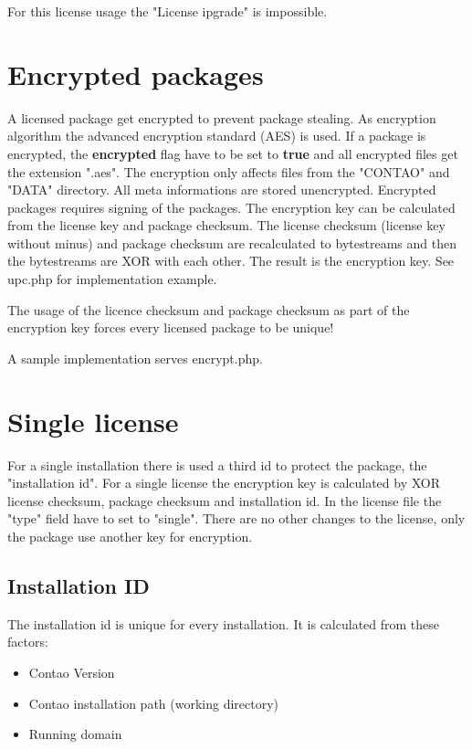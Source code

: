For this license usage the "License ipgrade" is impossible.

\section[sec:encrypted packages]{Encrypted packages}

A licensed package get encrypted to prevent package stealing.
As encryption algorithm the advanced encryption standard (AES) is used.
If a package is encrypted, the \textbf{encrypted} flag have to be set to \textbf{true} and all encrypted files get the extension ".aes".
The encryption only affects files from the "CONTAO" and "DATA" directory.
All meta informations are stored unencrypted.
Encrypted packages requires signing of the packages.
The encryption key can be calculated from the license key and package checksum.
The license checksum (license key without minus) and package checksum are recalculated to bytestreams and then the bytestreams are XOR with each other. The result is the encryption key.
See upc.php for implementation example.

The usage of the licence checksum and package checksum as part of the encryption key forces every licensed package to be unique!

A sample implementation serves encrypt.php.

\section[sec:single license]{Single license}

For a single installation there is used a third id to protect the package, the "installation id". For a single license the encryption key is calculated by XOR license checksum, package checksum and installation id. In the license file the "type" field have to set to "single". There are no other changes to the license, only the package use another key for encryption.

\subsection[sec:installation id]{Installation ID}

The installation id is unique for every installation. It is calculated from these factors:
\begin{itemize}
\item Contao Version 
\item Contao installation path (working directory)
\item Running domain
\end{itemize}

